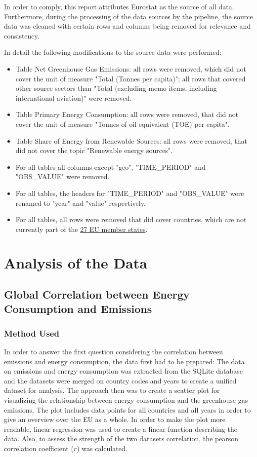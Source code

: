 \documentclass{article}
\begin{document}
In order to comply, this report attributes Eurostat as the source of all data.
Furthermore, during the processing of the data sources by the pipeline, the source data was cleaned with certain
rows and columns being removed for relevance and consistency.

In detail the following modifications to the source data were performed:
\begin{itemize}
    \item Table Net Greenhouse Gas Emissions: all rows were removed, which did not cover the unit of measure "Total (Tonnes per capita)";
    all rows that covered other source sectors than "Total (excluding memo items, including international aviation)" were removed.
    \item Table Primary Energy Consumption: all rows were removed, that did not cover the unit of measure "Tonnes of oil equivalent (TOE) per capita".
    \item Table Share of Energy from Renewable Sources: all rows were removed, that did not cover the topic "Renewable energy sources".
    \item For all tables all columns except "geo", "TIME\_PERIOD" and "OBS\_VALUE" were removed.
    \item For all tables, the headers for "TIME\_PERIOD" and "OBS\_VALUE" were renamed to "year" and "value" respectively.
    \item For all tables, all rows were removed that did cover countries, which are not currently part of the \href{https://www.destatis.de/Europa/EN/Country/Country-Codes.html}{27 EU member states}.
\end{itemize}

\section*{Analysis of the Data}
\subsection*{Global Correlation between Energy Consumption and Emissions}
\subsubsection*{Method Used}
In order to answer the first question considering the correlation between emissions and energy consumption, the data first had to be prepared:
The data on emissions and energy consumption was extracted from the SQLite database and the datasets were merged on
country codes and years to create a unified dataset for analysis.
The approach then was to create a scatter plot for visualizing the relationship between energy consumption and the
greenhouse gas emissions. The plot includes data points for all countries and all years in order to give an overview
over the EU as a whole.
In order to make the plot more readable, linear regression was used to create a linear function describing the data.
Also, to assess the strength of the two datasets correlation, the pearson correlation coefficient ($r$) was calculated.
\end{document}
